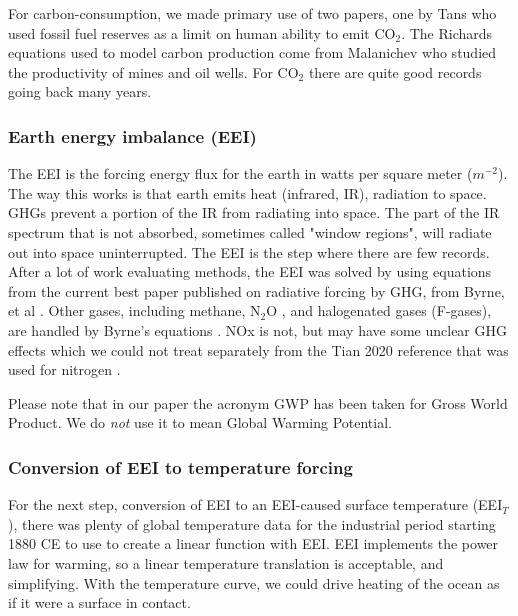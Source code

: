\documentclass{article}
\begin{document}
For carbon-consumption, we made primary use of two papers, one by Tans \cite{Tans2009_OceanicandAtmosCO2} who used fossil fuel reserves as a limit on human ability to emit CO$_2$. The Richards equations used to model carbon production come from Malanichev \cite{Malanichev2018LimitsShaleOil} who studied the productivity of mines and oil wells. For CO$_2$ there are quite good records going back many years.  

\subsubsection{Earth energy imbalance (EEI)} The EEI is the forcing energy flux for the earth in watts per square meter ($m^{-2}$). The way this works is that earth emits heat (infrared, IR), radiation to space. GHGs prevent a portion of the IR from radiating into space. The part of the IR spectrum that is not absorbed, sometimes called "window regions", will radiate out into space uninterrupted.  The EEI is the step where there are few records. After a lot of work evaluating methods, the EEI was solved by using equations from the current best paper published on radiative forcing by GHG, from Byrne, et al \cite{Byrne2014RadiativeForcingEquations}. Other gases, including methane, N$_2$O \cite{Tian2020N2OSources_sinks}, and halogenated gases (F-gases), are handled by Byrne's equations \cite{Byrne2014RadiativeForcingEquations}. NOx \cite{Lammel1995GreenhouseOFNoX} is not, but may have some unclear GHG effects which we could not treat separately from the Tian 2020 reference that was used for nitrogen \cite{Tian2020N2OSources_sinks}. 

Please note that in our paper the acronym GWP has been taken for Gross World Product. We do \emph{not} use it to mean Global Warming Potential.

 \subsubsection{Conversion of EEI to temperature forcing} For the next step, conversion of EEI to an EEI-caused surface temperature (EEI$_T$), there was plenty of global temperature data for the industrial period starting 1880 CE to use to create a linear function with EEI. EEI implements the power law for warming, so a linear temperature translation is acceptable, and simplifying. With the temperature curve, we could drive heating of the ocean as if it were a surface in contact. 
\end{document}
